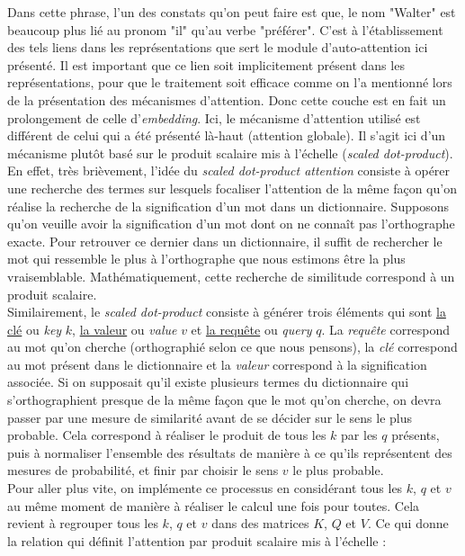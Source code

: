 \begin{itemize}
Dans cette phrase, l'un des constats qu'on peut faire est que, le nom "Walter" est beaucoup plus lié au pronom "il" qu'au verbe "préférer". C'est à l'établissement des tels liens dans les représentations que sert le module d'auto-attention ici présenté. Il est important que ce lien soit implicitement présent dans les représentations, pour que le traitement soit efficace comme on l'a mentionné lors de la présentation des mécanismes d'attention. Donc cette couche est en fait un prolongement de celle d'\textit{embedding}. Ici, le mécanisme d'attention utilisé est différent de celui qui a été présenté là-haut (attention globale). Il s'agit ici d'un mécanisme plutôt basé sur le produit scalaire mis à l'échelle (\textit{scaled dot-product}). En effet, très brièvement, l'idée du \textit{scaled dot-product attention} consiste à opérer une recherche des termes sur lesquels focaliser l'attention de la même façon qu'on réalise la recherche de la signification d'un mot dans un dictionnaire. Supposons qu'on veuille avoir la signification d'un mot dont on ne connaît pas l'orthographe exacte. Pour retrouver ce dernier dans un dictionnaire, il suffit de rechercher le mot qui ressemble le plus à l'orthographe que nous estimons être la plus vraisemblable. Mathématiquement, cette recherche de similitude correspond à un produit scalaire.\\
Similairement, le \textit{scaled dot-product} consiste à générer trois éléments qui sont \underline{la clé} ou \textit{key} $ k $, \underline{la valeur} ou \textit{value} $ v $ et \underline{la requête} ou \textit{query} $ q $. La \textit{requête} correspond au mot qu'on cherche (orthographié selon ce que nous pensons), la \textit{clé} correspond au mot présent dans le dictionnaire et la \textit{valeur} correspond à la signification associée. Si on supposait qu'il existe plusieurs termes du dictionnaire qui s'orthographient presque de la même façon que le mot qu'on cherche, on devra passer par une mesure de similarité avant de se décider sur le sens le plus probable. Cela correspond à réaliser le produit de tous les $ k $ par les $ q $ présents, puis à normaliser l'ensemble des résultats de manière à ce qu'ils représentent des mesures de probabilité, et finir par choisir le sens $ v $ le plus probable.\\
Pour aller plus vite, on implémente ce processus en considérant tous les $ k $, $ q $ et $ v $ au même moment de manière à réaliser le calcul une fois pour toutes. Cela revient à regrouper tous les $ k $, $ q $ et $ v $ dans des matrices $ K $, $ Q $ et $ V $. Ce qui donne la relation  qui définit l'attention par produit scalaire mis à l'échelle \cite{vaswani2017attention} :

\end{itemize}
